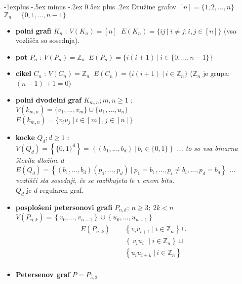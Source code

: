 \documentclass[a4paper,9pt]{extarticle}
\makeatletter
\renewcommand{\subsection}{\@startsection{subsection}{2}{0mm}%
                                {-1explus -.5ex minus -.2ex}%
                                {0.5ex plus .2ex}%
                                {\normalfont\normalsize\bfseries}}
\makeatother
\begin{document}
\begin{multicols}{3}
\subsection{Družine grafov}
$[n] = \{1,2,...,n\}$\\
$\mathbb{Z}_n = \{0,1,...,n-1\}$
\begin{itemize}
    \item \textbf{polni grafi} $K_n$ : $V(K_n) = [n] \ $ $E(K_n) = \{ij\ |\ i \neq j; i,j \in [n]\}$ (vsa vozlišča so sosednja).
    \item \textbf{pot} $P_n$ : $V(P_n) = \mathbb{Z}_n \ $ $E(P_n) = \{ i(i+1)\ |\ i \in \{0, ..., n-1\}\}$
    \item \textbf{cikel} $C_n$ : $V(C_n) = \mathbb{Z}_n \ $ $E(C_n) = \{ i(i+1)\ |\ i \in \mathbb{Z}_n\}$ ($\mathbb{Z}_n$ je grupa: $(n-1)+1 = 0$)
    \item \textbf{polni dvodelni graf} $K_{m,n}; m,n \ge 1$ : \\
    $V(k_{m,n}) = \{v_1, ..., v_m\} \cup \{u_1, ..., u_n\}\ $ \\
    $E(k_{m,n}) = \{v_i u_j\ |\ i\in[m], j\in[n]\}$ \\
    \item \textbf{kocke} $Q_d; d\geq 1$ : \\
    $V(Q_d) = \left\{ \{0,1\}^d \right\} = \left\{ (b_1, ..., b_d)\ |\ b_i \in \{0,1\} \right\}$ \emph{... to so vsa binarna števila dložine $d$} \\
    $E(Q_d) = \left\{ (b_1, ..., b_d)(p_1, ..., p_d)\ |\ p_1 = b_1, ..., p_i \neq b_i, ..., p_d = b_d \right\}$ \emph{... vozlišči sta sosednji, če se razlikujeta le v enem bitu.}\\
    $Q_d$ je $d$-regularen graf.
    \item \textbf{posplošeni petersonovi grafi} $P_{n,k};\ n\geq3;\ 2k<n$\\
    $V(P_{n,k}) = \left\{ v_0, ..., v_{n-1} \right\} \cup \left\{ u_0, ..., u_{n-1} \right\}$\\
    \begin{equation*}
        \begin{aligned}
        E(P_{n,k}) =& \left\{ v_i v_{i+1}\ |\ i\in \mathbb{Z}_n\right\} \cup\\
        & \left\{ \ v_i u_i\ \ \ |\ i\in \mathbb{Z}_n \right\} \cup\\
        & \left\{ u_i u_{i+k}\ |\ i \in \mathbb{Z}_n \right\} \\
        \end{aligned}
    \end{equation*}
    \item \textbf{Petersenov graf} $P = P_{5,2} $
\end{itemize}


\end{multicols}
\end{document}
